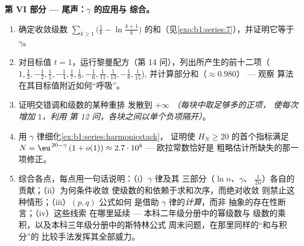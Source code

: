 \begin{problem}[{周末问题 --- $H_n = \ln n + \gamma +
\frac{1}{2n} + O(n^{-2})$，并将 $1 - \frac12 +
\frac13 - \dots$ 重排为 $\frac{\ln 2}{2}$}]
\medskip
\noindent\textbf{第 VI 部分 --- 尾声：$\gamma$ 的应用与
综合。}
\begin{enumerate}[resume]
  \item 确定收敛级数
        $\sum_{k\geq1} \bigl(\frac1k - \ln\frac{k+1}{k}\bigr)$
        的和（见\cref{exo:b1:series:7}），并证明它等于 $\gamma$。
  \item 对目标值 $t =
        1$，运行黎曼配方（第 14 问），列出所产生的前十二项（$1, \frac13,
        -\frac12, \frac15, -\frac14, \frac17, \frac19, -\frac16,
        \frac1{11}, \frac1{13}, -\frac18, \frac1{15}$),
        并计算部分和（$\approx 0.980$） --- 观察
        算法在其目标值附近如何“呼吸”。
  \item 证明交错调和级数的某种重排
        发散到 $+\infty$ \emph{（每块中取足够多的正项，
        使每次增加 $1$，利用
        第 12 问，各块之间以单个负项隔开）}。
  \item 用 $\gamma$ 律细化\cref{ex:b1:series:harmonicstack}，
        证明使 $H_N \geq
        20$ 的首个指标满足 $N = \eu^{\,20 - \gamma}\,(1 + o(1))
        \approx 2.7\cdot10^{8}$ --- 欧拉常数恰好是
        粗略估计所缺失的那一项修正。
  \item 综合各点，每点用一句话说明：（i）$\gamma$ 律及其
        三部分（$\ln n$、$\gamma$、
        $\frac{1}{2n}$）各自的贡献；（ii）为何条件收敛
        使级数的和依赖于求和次序，而绝对收敛
        则禁止这种情形；（iii）$(p,q)$ 公式如何
        是借助 $\gamma$ 律的\emph{计算}，而非
        抽象的存在性断言；（iv）这些线索
        在哪里延续 --- 本科二年级分册中的幂级数与
        级数的乘积，以及本科三年级分册中的斯特林公式
        周末问题，在那里同样的“和与积分”的
        比较手法发挥其全部威力。
\end{enumerate}
\end{problem}
